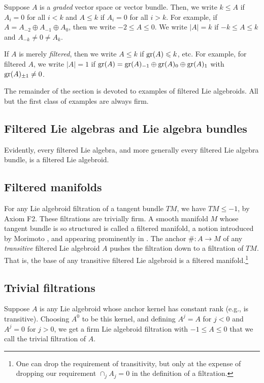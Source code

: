 \documentclass[leqno,12pt]{amsart} %
\begin{document}
\begin{notation}
  Suppose $A$ is a {\em graded} vector space or vector bundle. Then, we write $k \le A$ if
  $A_i=0$ for all $i < k$ and $A \le k$ if $A_i=0$ for all $i > k$. For example, if
  $A = A_{-2}\oplus A_{-1} \oplus A_0$, then we write $-2 \le A \le 0$. We write
  $|A| = k $ if $-k \le A \le k$ and $A_{-k} \ne 0 \ne A_k$.

  If $A$ is merely {\em filtered}, then we write $A \le k$ if $\operatorname{\operatorname{gr}}(A) \leqslant k$, etc. For
  example, for filtered $A$, we write $|A| = 1$ if
  $\operatorname{\operatorname{gr}}(A) = \operatorname{\operatorname{gr}}(A)_{-1} \oplus \operatorname{\operatorname{gr}}(A)_0 \oplus \operatorname{\operatorname{gr}}(A)_1$ with
  $\operatorname{\operatorname{gr}}(A)_{\pm 1} \ne 0$.
\end{notation}

The remainder of the section is devoted to examples of filtered Lie algebroids. All but
the first class of examples are always firm.

\subsection{ Filtered Lie algebras and Lie algebra bundles} Evidently, every filtered
Lie algebra, and more generally every filtered Lie algebra bundle, is a filtered Lie
algebroid.

\subsection{ Filtered manifolds} For any Lie algebroid filtration of a tangent bundle
$TM$, we have $TM \le -1$, by Axiom F2.  These filtrations are trivially firm. A smooth
manifold $M$ whose tangent bundle is so structured is called a {\df filtered manifold}, a
notion introduced by Morimoto \cite{Morimoto_93}, and appearing prominently in
\cite{Cap_Slovak_09}.  The anchor $\# \colon A \rightarrow M$ of any {\em transitive}
filtered Lie algebroid $A$ pushes the filtration down to a filtration of $TM$. That is,
the base of any transitive filtered Lie algebroid is a filtered manifold.\footnote{One can
  drop the requirement of transitivity, but only at the expense of dropping our
  requirement $\cap_jA_j=0$ in the definition of a filtration.} \label{yt}

\subsection{Trivial filtrations}\label{trivial} Suppose $A$ is any Lie algebroid whose anchor kernel has
constant rank (e.g., is transitive). Choosing $A^0$ to be this kernel, and defining
$A^j=A$ for $j<0$ and $A^j = 0$ for $j>0$, we get a firm Lie algebroid filtration with
$-1 \le A \le 0 $ that we call the {\df trivial filtration} of $A$.
\end{document}
